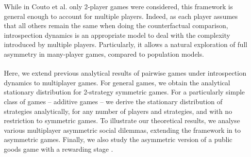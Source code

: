 \documentclass[11pt]{article}
\theoremstyle{plainCl1}
\theoremstyle{plainCl2}
\begin{document}
While in Couto et al. \cite{Couto:NJP:2022} only 2-player games were considered, this framework is general enough to account for multiple players. Indeed, as each player assumes that all others remain the same when doing the counterfactual comparison, introspection dynamics is an appropriate model to deal with the complexity introduced by multiple players. Particularly, it allows a natural exploration of full asymmetry in many-player games, compared to population models.
\\ \\
\noindent Here, we extend previous analytical results of pairwise games under introspection dynamics to multiplayer games. 
For general games, we obtain the analytical stationary distribution for 2-strategy symmetric games.
For a particularly simple class of games -- additive games -- we derive the stationary distribution of strategies analytically, for any number of players and strategies, and with no restriction to symmetric games. 
To illustrate our theoretical results, we analyse various multiplayer asymmetric social dilemmas, extending the framework in \cite{Hauert:JTB:2006a} to asymmetric games. Finally, we also study the asymmetric version of a public goods game with a rewarding stage \cite{Pal:NatCom:2022}.
\end{document}
